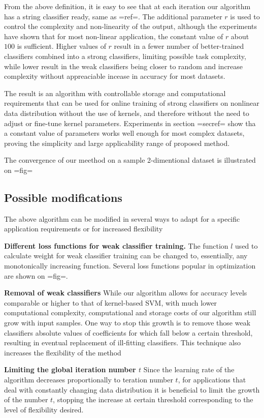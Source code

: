 From the above definition, it is easy to see that at each iteration our algorithm has a string classifier ready, same as {{=ref=}}. The additional parameter $r$ is used to control the complexity and non-linearity of the output, although the experiments have shown that for most non-linear application, the constant value of $r$ about $100$ is sufficient. Higher values of $r$ result in a fewer number of better-trained classifiers combined into a strong classifiers, limiting possible task complexity, while lower result in the weak classifiers  being closer to random and increase complexity without appreaciable incease in accuracy for most datasets. 

The result is an algorithm with controllable storage and computational requirements that can be used for online training of strong classifiers on nonlinear data distribution without the use of kernels, and therefore without the need to adjust or fine-tune kernel parameters. Experiments in section {{=secref=}} show tha a constant value of parameters works well enough for most complex datasets, proving the simplicity and large applicability range of proposed method. 

The convergence of our meethod on a sample 2-dimentional dataset is illustrated on {{=fig=}}
\subsection {Possible modifications}
The above algorithm can be modified in several ways to adapt for a specific application requirements or for increased flexibility

{\bf Different loss functions for weak classifier training. }
The function $l$ used to calculate weight for weak classifier training can be changed to, essentially, any monotonically increasing function. Several loss functions popular in optimization are shown on {{=fig=}}.  

{\bf Removal of weak classifiers}
While our algorithm allows for accuracy levels comparable or higher to that of kernel-based SVM, with much lower computational complexity, computational and storage costs of our algorithm still grow with input samples. One way to stop this growth is to remove those weak classifiers absolute values of coefficients for which fall below a certain threshold, resulting in eventual replacement of ill-fitting classifiers. This technique also increases the flexibility of the method

{\bf Limiting the global iteration number $t$} Since the learning rate of the algorithm decreases proportionally to teration number $t$, for applications that deal with constantly changing data distribution it is beneficial to limit the growth of the number $t$, stopping the increase at certain threshold corresponding to the level of flexibility desired. 
 
